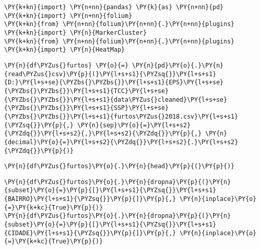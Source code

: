 \begin{tcolorbox}[breakable, size=fbox, boxrule=1pt, pad at break*=1mm,colback=cellbackground, colframe=cellborder]
\begin{Verbatim}[commandchars=\\\{\}]
\PY{k+kn}{import} \PY{n+nn}{pandas} \PY{k}{as} \PY{n+nn}{pd}
\PY{k+kn}{import} \PY{n+nn}{folium}
\PY{k+kn}{from} \PY{n+nn}{folium}\PY{n+nn}{.}\PY{n+nn}{plugins} \PY{k+kn}{import} \PY{n}{MarkerCluster}
\PY{k+kn}{from} \PY{n+nn}{folium}\PY{n+nn}{.}\PY{n+nn}{plugins} \PY{k+kn}{import} \PY{n}{HeatMap}
\end{Verbatim}
\end{tcolorbox}

    \begin{tcolorbox}[breakable, size=fbox, boxrule=1pt, pad at break*=1mm,colback=cellbackground, colframe=cellborder]
\begin{Verbatim}[commandchars=\\\{\}]
\PY{n}{df\PYZus{}furtos} \PY{o}{=} \PY{n}{pd}\PY{o}{.}\PY{n}{read\PYZus{}csv}\PY{p}{(}\PY{l+s+s1}{\PYZsq{}}\PY{l+s+s1}{D:}\PY{l+s+se}{\PYZbs{}\PYZbs{}}\PY{l+s+s1}{EPS}\PY{l+s+se}{\PYZbs{}\PYZbs{}}\PY{l+s+s1}{TCC}\PY{l+s+se}{\PYZbs{}\PYZbs{}}\PY{l+s+s1}{data\PYZus{}cleaned}\PY{l+s+se}{\PYZbs{}\PYZbs{}}\PY{l+s+s1}{SSP}\PY{l+s+se}{\PYZbs{}\PYZbs{}}\PY{l+s+s1}{furtos\PYZus{}2018.csv}\PY{l+s+s1}{\PYZsq{}}\PY{p}{,} \PY{n}{sep}\PY{o}{=}\PY{l+s+s2}{\PYZdq{}}\PY{l+s+s2}{,}\PY{l+s+s2}{\PYZdq{}}\PY{p}{,} \PY{n}{decimal}\PY{o}{=}\PY{l+s+s2}{\PYZdq{}}\PY{l+s+s2}{.}\PY{l+s+s2}{\PYZdq{}}\PY{p}{)}
\end{Verbatim}
\end{tcolorbox}

    \begin{tcolorbox}[breakable, size=fbox, boxrule=1pt, pad at break*=1mm,colback=cellbackground, colframe=cellborder]
\begin{Verbatim}[commandchars=\\\{\}]
\PY{n}{df\PYZus{}furtos}\PY{o}{.}\PY{n}{head}\PY{p}{(}\PY{p}{)}
\end{Verbatim}
\end{tcolorbox}

    \begin{tcolorbox}[breakable, size=fbox, boxrule=1pt, pad at break*=1mm,colback=cellbackground, colframe=cellborder]
\begin{Verbatim}[commandchars=\\\{\}]
\PY{n}{df\PYZus{}furtos}\PY{o}{.}\PY{n}{dropna}\PY{p}{(}\PY{n}{subset}\PY{o}{=}\PY{p}{[}\PY{l+s+s1}{\PYZsq{}}\PY{l+s+s1}{BAIRRO}\PY{l+s+s1}{\PYZsq{}}\PY{p}{]}\PY{p}{,} \PY{n}{inplace}\PY{o}{=}\PY{k+kc}{True}\PY{p}{)}
\PY{n}{df\PYZus{}furtos}\PY{o}{.}\PY{n}{dropna}\PY{p}{(}\PY{n}{subset}\PY{o}{=}\PY{p}{[}\PY{l+s+s1}{\PYZsq{}}\PY{l+s+s1}{CIDADE}\PY{l+s+s1}{\PYZsq{}}\PY{p}{]}\PY{p}{,} \PY{n}{inplace}\PY{o}{=}\PY{k+kc}{True}\PY{p}{)}
\end{Verbatim}
\end{tcolorbox}

